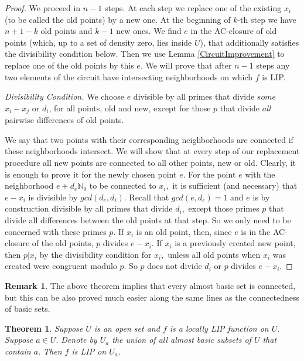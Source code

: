 \documentclass[10pt]{article}
\newtheorem{theorem}{Theorem}
\theoremstyle{definition}
\newtheorem{remark}{Remark}
\begin{document}
\begin{proof}
We proceed in $n-1$ steps. At each step we replace one of the existing $x_i$ (to be called the old  points) by a new one. At the beginning of $k$-th step we have $n+1-k$ old points and $k-1$ new ones. We find $e$ in the AC-closure of old points (which, up to a set of density zero, lies inside $U$), that additionally satisfies the divisibility condition below. Then we use Lemma \ref{CircuitImprovement} to replace one of the old points by this $e$. We will prove that after $n-1$ steps any two elements of the circuit have intersecting neighborhoods on which $f$ is LIP.

{\it Divisibility Condition.} We choose $e$ divisible by all primes that divide $some$ $x_i-x_j$ or $d_i$, for all points, old and new, except for those $p$ that divide $all$ pairwise differences of old points.

We say that two points with their corresponding neighborhoods are connected if these neighborhoods intersect. We will show that at every step of our replacement procedure all new points are connected to all other points, new or old. Clearly, it is enough to prove it for the newly chosen point $e$. For the point $e$ with the neighborhood $e+d_e\mathbb N_0$ to be connected to $x_i,$ it is sufficient (and necessary) that $e-x_i$ is divisible by $gcd(d_e,d_i)$. Recall that $gcd(e,d_e)=1$ and $e$ is by construction divisible by all primes that divide $d_i,$ except those primes $p$ that divide all differences between the old points at that step. So we only need to be concerned with these primes $p$. If $x_i$ is an old point, then, since $e$ is in the AC-closure of the old points, $p$ divides $e-x_i.$ If $x_i$ is a previously created new point, then $p|x_i$ by the divisibility condition for $x_i,$ unless all old points when $x_i$ was created  were congruent modulo $p.$ So $p$ does not divide $d_i$ or $p$ divides $e-x_i$.   
\end{proof}

\begin{remark} The above theorem implies that every almost basic set is connected, but this can be also proved much easier along the same lines as the connectedness of basic sets.
\end{remark}

\begin{theorem} \label{Infstar} Suppose $U$ is an open set and $f$ is a locally LIP function on $U.$ Suppose $a\in U.$ Denote by $U_a$ the union of all almost basic subsets of $U$ that contain $a.$ Then $f$ is LIP on $U_a.$ 
\end{theorem}
\end{document}
